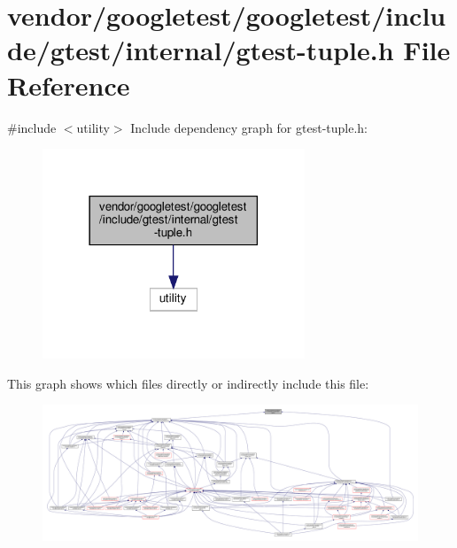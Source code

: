 \hypertarget{gtest-tuple_8h}{}\section{vendor/googletest/googletest/include/gtest/internal/gtest-\/tuple.h File Reference}
\label{gtest-tuple_8h}
{\ttfamily \#include $<$utility$>$}\newline
Include dependency graph for gtest-\/tuple.h\+:
\nopagebreak
\begin{figure}[H]
\begin{center}
\leavevmode
\includegraphics[width=222pt]{gtest-tuple_8h__incl}
\end{center}
\end{figure}
This graph shows which files directly or indirectly include this file\+:
\nopagebreak
\begin{figure}[H]
\begin{center}
\leavevmode
\includegraphics[width=350pt]{gtest-tuple_8h__dep__incl}
\end{center}
\end{figure}
